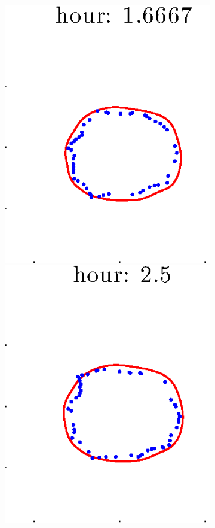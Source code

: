 \documentclass[12pt]{article}
\begin{document}
\begin{figure}[h!]
\begin{subfigure}[b]{.3\textwidth}
		\includegraphics[height=.15\textheight]{Pos10exp2/firsthalf/full3.eps}
		\includegraphics[height=.15\textheight]{Pos10exp2/firsthalf/full4.eps}

\end{subfigure}
\end{figure}
\end{document}
